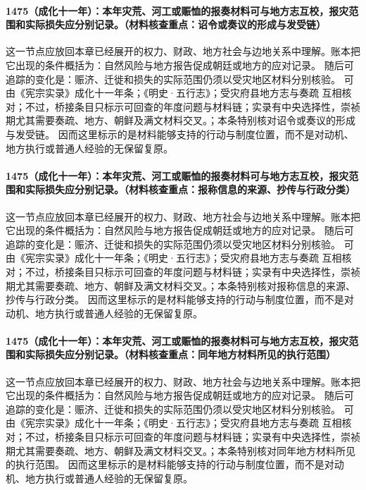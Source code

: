 \paragraph{1475（成化十一年）：本年灾荒、河工或赈恤的报奏材料可与地方志互校，报灾范围和实际损失应分别记录。（材料核查重点：诏令或奏议的形成与发受链）} 这一节点应放回本章已经展开的权力、财政、地方社会与边地关系中理解。账本把它出现的条件概括为：自然风险与地方报告促成朝廷或地方的应对记录。 随后可追踪的变化是：赈济、迁徙和损失的实际范围仍须以受灾地区材料分别核验。 可由《宪宗实录》成化十一年条；《明史·五行志》；受灾府县地方志与奏疏 互相核对；不过，桥接条目只标示可回查的年度问题与材料链；实录有中央选择性，崇祯期尤其需要奏疏、地方、朝鲜及满文材料交叉。；本条特别核对诏令或奏议的形成与发受链。 因而这里标示的是材料能够支持的行动与制度位置，而不是对动机、地方执行或普通人经验的无保留复原。

\paragraph{1475（成化十一年）：本年灾荒、河工或赈恤的报奏材料可与地方志互校，报灾范围和实际损失应分别记录。（材料核查重点：报称信息的来源、抄传与行政分类）} 这一节点应放回本章已经展开的权力、财政、地方社会与边地关系中理解。账本把它出现的条件概括为：自然风险与地方报告促成朝廷或地方的应对记录。 随后可追踪的变化是：赈济、迁徙和损失的实际范围仍须以受灾地区材料分别核验。 可由《宪宗实录》成化十一年条；《明史·五行志》；受灾府县地方志与奏疏 互相核对；不过，桥接条目只标示可回查的年度问题与材料链；实录有中央选择性，崇祯期尤其需要奏疏、地方、朝鲜及满文材料交叉。；本条特别核对报称信息的来源、抄传与行政分类。 因而这里标示的是材料能够支持的行动与制度位置，而不是对动机、地方执行或普通人经验的无保留复原。

\paragraph{1475（成化十一年）：本年灾荒、河工或赈恤的报奏材料可与地方志互校，报灾范围和实际损失应分别记录。（材料核查重点：同年地方材料所见的执行范围）} 这一节点应放回本章已经展开的权力、财政、地方社会与边地关系中理解。账本把它出现的条件概括为：自然风险与地方报告促成朝廷或地方的应对记录。 随后可追踪的变化是：赈济、迁徙和损失的实际范围仍须以受灾地区材料分别核验。 可由《宪宗实录》成化十一年条；《明史·五行志》；受灾府县地方志与奏疏 互相核对；不过，桥接条目只标示可回查的年度问题与材料链；实录有中央选择性，崇祯期尤其需要奏疏、地方、朝鲜及满文材料交叉。；本条特别核对同年地方材料所见的执行范围。 因而这里标示的是材料能够支持的行动与制度位置，而不是对动机、地方执行或普通人经验的无保留复原。

